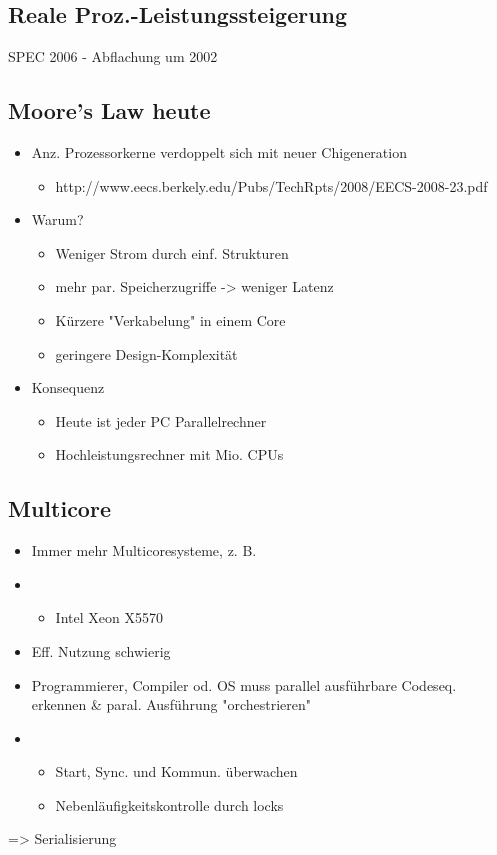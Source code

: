 \subsection{Reale Proz.-Leistungssteigerung}
SPEC 2006 - Abflachung um 2002

\subsection{Moore's Law heute}

\begin{itemize}
	\item Anz. Prozessorkerne verdoppelt sich mit neuer Chigeneration
		\begin{itemize}
			\item http://www.eecs.berkely.edu/Pubs/TechRpts/2008/EECS-2008-23.pdf
		\end{itemize}
	\item Warum?
		\begin{itemize}
			\item Weniger Strom durch einf. Strukturen
			\item mehr par. Speicherzugriffe -> weniger Latenz
			\item Kürzere "Verkabelung" in einem Core
			\item geringere Design-Komplexität
		\end{itemize}
	\item Konsequenz
		\begin{itemize}
			\item Heute ist jeder PC Parallelrechner
			\item Hochleistungsrechner mit Mio. CPUs
		\end{itemize}
\end{itemize}


\subsection{Multicore}

\begin{itemize}
	\item  Immer mehr Multicoresysteme, z. B.
	\item 
		\begin{itemize}
			\item Intel Xeon X5570
		\end{itemize}
	\item  Eff. Nutzung schwierig
	\item  Programmierer, Compiler od. OS muss parallel ausführbare Codeseq. erkennen \& paral. Ausführung "orchestrieren"
	\item 
		\begin{itemize}
			\item Start, Sync. und Kommun. überwachen
			\item Nebenläufigkeitskontrolle durch locks
		\end{itemize}
\end{itemize}
=> Serialisierung

